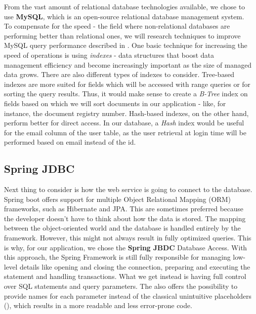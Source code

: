 From the vast amount of relational database technologies available, we chose to use \textbf{MySQL}, which is an open-source relational database management system. To compensate for the speed - the field where non-relational databases are performing better than relational ones, we will research techniques to improve MySQL query performance described in \cite{highPerformanceMySQL}. One basic technique for increasing the speed of operations is using \textit{indexes} - data structures that boost data management efficiency and become increasingly important as the size of managed data grows. There are also different types of indexes to consider. Tree-based indexes are more suited for fields which will be accessed with range queries or for sorting the query results. Thus, it would make sense to create a \textit{B-Tree} index on fields based on which we will sort documents in our application - like, for instance, the document registry number. Hash-based indexes, on the other hand, perform better for direct access. In our database, a \textit{Hash} index would be useful for the email column of the user table, as the user retrieval at login time will be performed based on email instead of the id.


\subsection{Spring JDBC}
\label{section:springJdbc}

Next thing to consider is how the web service is going to connect to the database. Spring boot offers support for multiple Object Relational Mapping (ORM) frameworks, such as Hibernate and JPA. This are sometimes preferred because the developer doesn't have to think about how the data is stored. The mapping between the object-oriented world and the database is handled entirely by the framework. However, this might not always result in fully optimized queries. This is why, for our application, we chose the \textbf{Spring JBDC} Database Access. With this approach, the Spring Framework is still fully responsible for managing low-level details like opening and closing the connection, preparing and executing the statement and handling transactions. What we get instead is having full control over SQL statements and query parameters. The  also offers the possibility to provide names for each parameter instead of the classical unintuitive placeholders (), which results in a more readable and less error-prone code.


